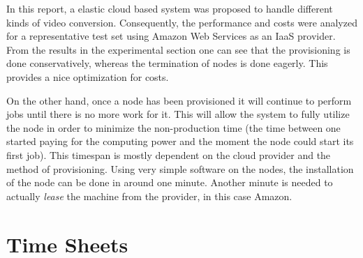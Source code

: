 \documentclass[a4paper]{IEEEtran}
\begin{document}
In this report, a elastic cloud based system was proposed to handle different kinds of video conversion.
Consequently, the performance and costs were analyzed for a representative test set using Amazon Web Services as an IaaS provider.
From the results in the experimental section one can see that the provisioning is done conservatively, whereas the termination of nodes is done eagerly.
This provides a nice optimization for costs.

On the other hand, once a node has been provisioned it will continue to perform jobs until there is no more work for it. 
This will allow the system to fully utilize the node in order to minimize the non-production time (the time between one started paying for the computing power and the moment the node could start its first job).
This timespan is mostly dependent on the cloud provider and the method of provisioning.
Using very simple software on the nodes, the installation of the node can be done in around one minute.
Another minute is needed to actually \textit{lease} the machine from the provider, in this case Amazon.


\appendix
\section{Time Sheets}
\end{document}
